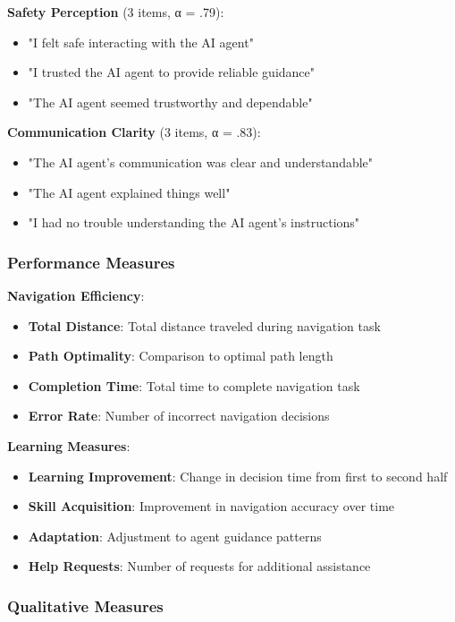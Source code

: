 \documentclass[12pt]{article}
\begin{document}
\textbf{Safety Perception} (3 items, α = .79):
\begin{itemize}
    \item "I felt safe interacting with the AI agent"
    \item "I trusted the AI agent to provide reliable guidance"
    \item "The AI agent seemed trustworthy and dependable"
\end{itemize}

\textbf{Communication Clarity} (3 items, α = .83):
\begin{itemize}
    \item "The AI agent's communication was clear and understandable"
    \item "The AI agent explained things well"
    \item "I had no trouble understanding the AI agent's instructions"
\end{itemize}

\subsubsection{Performance Measures}

\textbf{Navigation Efficiency}:
\begin{itemize}
    \item \textbf{Total Distance}: Total distance traveled during navigation task
    \item \textbf{Path Optimality}: Comparison to optimal path length
    \item \textbf{Completion Time}: Total time to complete navigation task
    \item \textbf{Error Rate}: Number of incorrect navigation decisions
\end{itemize}

\textbf{Learning Measures}:
\begin{itemize}
    \item \textbf{Learning Improvement}: Change in decision time from first to second half
    \item \textbf{Skill Acquisition}: Improvement in navigation accuracy over time
    \item \textbf{Adaptation}: Adjustment to agent guidance patterns
    \item \textbf{Help Requests}: Number of requests for additional assistance
\end{itemize}

\subsubsection{Qualitative Measures}
\end{document}
